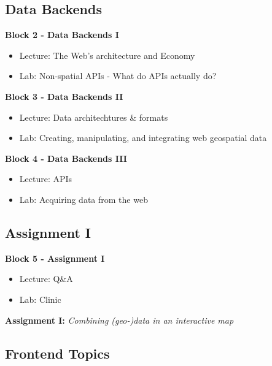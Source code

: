 \documentclass[
  letterpaper,
  DIV=11,
  numbers=noendperiod]{scrreprt}
\begin{document}
\hypertarget{data-backends}{%
\subsection*{Data Backends}\label{data-backends}}

\textbf{Block 2 - Data Backends I}

\begin{itemize}
\item
  Lecture: The Web's architecture and Economy
\item
  Lab: Non-spatial APIs - What do APIs actually do?
\end{itemize}

\textbf{Block 3 - Data Backends II}

\begin{itemize}
\item
  Lecture: Data architechtures \& formats
\item
  Lab: Creating, manipulating, and integrating web geospatial data
\end{itemize}

\textbf{Block 4 - Data Backends III}

\begin{itemize}
\item
  Lecture: APIs
\item
  Lab: Acquiring data from the web
\end{itemize}

\hypertarget{assignment-i}{%
\subsection*{Assignment I}\label{assignment-i}}

\textbf{Block 5 - Assignment I}

\begin{itemize}
\item
  Lecture: Q\&A
\item
  Lab: Clinic
\end{itemize}

\textbf{Assignment I:} \emph{Combining (geo-)data in an interactive map}

\hypertarget{frontend-topics}{%
\subsection*{Frontend Topics}\label{frontend-topics}}
\end{document}
